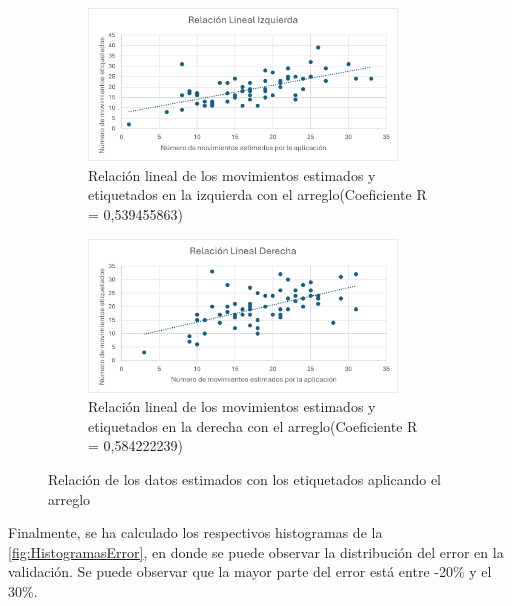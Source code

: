 \begin{figure}[H]
    \centering
    \begin{subfigure}[b]{0.7\textwidth}
        \centering
        \includegraphics[width=0.9\textwidth]{images/7/IzquierdaBien.png}
        \caption{Relación lineal de los movimientos estimados y etiquetados en la izquierda con el arreglo(Coeficiente R = 0,539455863)}
    \end{subfigure}
    \begin{subfigure}[b]{0.7\textwidth}
        \centering
        \includegraphics[width=0.9\textwidth]{images/7/DerechaBien.png}
        \caption{Relación lineal de los movimientos estimados y etiquetados en la derecha con el arreglo(Coeficiente R = 0,584222239)}
    \end{subfigure}
    \caption{Relación de los datos estimados con los etiquetados aplicando el arreglo}
    \label{fig:EtiquetadosBien}
\end{figure}
\vspace{3\baselineskip}
Finalmente, se ha calculado los respectivos histogramas de la \autoref{fig:HistogramasError}, en donde se puede observar la distribución del error en la validación. Se puede observar que la mayor parte del error está entre -20\% y el 30\%.

